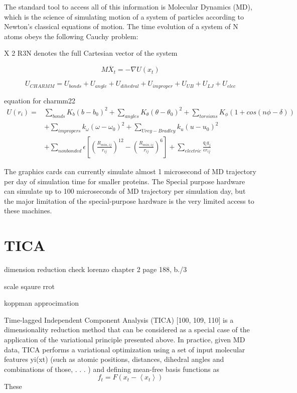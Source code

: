 The standard tool to access all of this information is Molecular Dynamics (MD), which is
the science of simulating motion of a system of particles according to Newton’s classical
equations of motion.
The time evolution of a system of N atoms obeys the following Cauchy problem:

X 2 R3N denotes the full Cartesian vector of the system


$$M\ddot{X_{t}}=-\nabla U(x_{t})$$

$$U_{CHARMM}=U_{bonds}+U_{angle}+U_{dihedral}+U_{improper}+U_{UB}+U_{LJ}+U_{elec}$$

equation for charmm22
\begin{equation}
\begin{aligned}
U(r_{i})={} &\sum_{bonds}K_{b}(b-b_{0})^{2}+\sum_{angles}K_{\theta}(\theta-\theta_{0})^{2}+\sum_{torsions}K_{\phi}\left(1+cos(n\phi-\delta)\right)\\
&+\sum_{impropers}k_{\omega}\left(\omega-\omega_{0}\right)^{2}+\sum_{Urey-Bradley}k_{u}\left(u-u_{0}\right)^{2}\\
&+\sum_{nonbonded}\epsilon\left[\left(\frac{R_{min,ij}}{r_{ij}}\right)^{12}-\left(\frac{R_{min,ij}}{r_{ij}}\right)^{6}\right]+\sum_{electric}\frac{q_{i}q_{j}}{\epsilon r_{ij}}
\end{aligned}
\end{equation}

The graphics cards can currently simulate almost 1 microsecond of MD trajectory per day of simulation time for smaller proteins. The Special purpose hardware can simulate up to 100 microseconds of MD trajectory per simulation day, but the major limitation of the special-purpose hardware is the very limited access to these machines. 

\section{TICA}
dimension reduction
check  lorenzo chapter 2
page 188, b./3

scale sqaure rrot

koppman approcimation


Time-lagged Independent Component Analysis (TICA) [100, 109, 110] is a dimensionality
reduction method that can be considered as a special case of the application of the
variational principle presented above. In practice, given MD data, TICA performs a variational
optimization using a set of input molecular features yi(xt) (such as atomic positions,
distances, dihedral angles and combinations of those, . . . ) and defining mean-free basis
functions as
$$f_{t}=F\left(x_{t}-\left\langle x_{t}\right\rangle \right)$$
These

